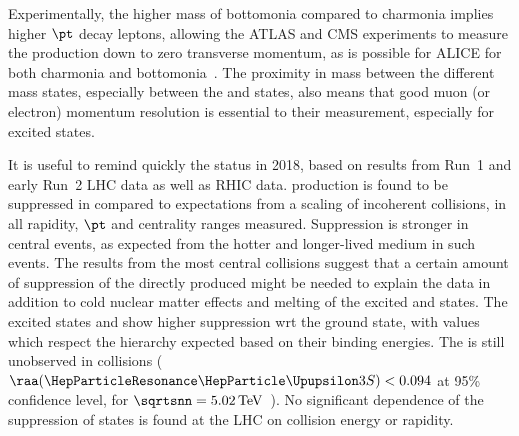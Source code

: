 \documentclass[../report.tex]{subfiles}
\begin{document}
Experimentally, the higher mass of bottomonia compared to charmonia implies higher $\pt$ decay leptons, allowing the ATLAS and CMS experiments to measure the production down to zero transverse momentum,
as is possible for ALICE for both charmonia and bottomonia~\cite{Abelev:2014nua,Acharya:2018mni}. The proximity in mass between the different mass states, especially between the  and  states, also 
means that good muon (or electron) momentum resolution is essential to their measurement, especially for excited states. 

It is useful to remind quickly the status in 2018, based on results from Run~1 and early Run~2 LHC data as well as RHIC data. \PGU production is found to be suppressed in \PbPb compared to expectations from a scaling of incoherent \pp collisions, in all rapidity, $\pt$ and centrality ranges measured. Suppression is stronger in central events, as expected from the hotter and longer-lived medium in such events.
The results from the most central collisions suggest that a certain amount of suppression of the directly produced  might be needed
  to explain the data in addition to cold nuclear matter effects and melting of the excited \PGU and \PGcb states.
The excited states  and  show higher suppression wrt the ground state, with \raa values which respect
  the hierarchy expected based on their binding energies. The  is still unobserved in \PbPb collisions ($\raa(\PGUP{3S})<0.094$ at 95\% confidence
level, for $\sqrtsnn = \unit[5.02]{TeV}$~\cite{Sirunyan:2017lzi,Sirunyan:2018nsz}). 
No significant dependence of the suppression of \PGU states is found at the LHC on collision energy or rapidity.
\end{document}
